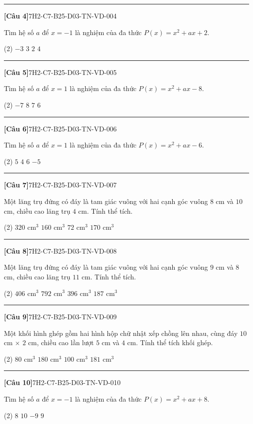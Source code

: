 \documentclass[12pt,a4paper]{article}
\newif\ifloigiai
\newenvironment{cauhoi}[2]{%
  \par\medskip\noindent\rule{\textwidth}{0.4pt}\par\nopagebreak
  \noindent\textbf{[#1]}\hfill{\scriptsize\ttfamily #2}\par\nopagebreak\smallskip}{\par}
\newcommand{\dapan}[1]{\ifloigiai\par\smallskip\noindent\textit{Đáp án:} \textbf{#1}\par\fi}
\begin{document}
\begin{cauhoi}{Câu 4}{7H2-C7-B25-D03-TN-VD-004}
Tìm hệ số $a$ để $x=-1$ là nghiệm của đa thức $P(x)=x^{2}+ax+2$.
\begin{tasks}(2)
\task $-3$
\task $3$
\task $2$
\task $4$
\end{tasks}
\dapan{B}
\end{cauhoi}
\begin{cauhoi}{Câu 5}{7H2-C7-B25-D03-TN-VD-005}
Tìm hệ số $a$ để $x=1$ là nghiệm của đa thức $P(x)=x^{2}+ax-8$.
\begin{tasks}(2)
\task $-7$
\task $8$
\task $7$
\task $6$
\end{tasks}
\dapan{C}
\end{cauhoi}
\begin{cauhoi}{Câu 6}{7H2-C7-B25-D03-TN-VD-006}
Tìm hệ số $a$ để $x=1$ là nghiệm của đa thức $P(x)=x^{2}+ax-6$.
\begin{tasks}(2)
\task $5$
\task $4$
\task $6$
\task $-5$
\end{tasks}
\dapan{A}
\end{cauhoi}
\begin{cauhoi}{Câu 7}{7H2-C7-B25-D03-TN-VD-007}
Một lăng trụ đứng có đáy là tam giác vuông với hai cạnh góc vuông $8$ cm và $10$ cm, chiều cao lăng trụ $4$ cm. Tính thể tích.
\begin{tasks}(2)
\task $320\text{ cm}^3$
\task $160\text{ cm}^3$
\task $72\text{ cm}^3$
\task $170\text{ cm}^3$
\end{tasks}
\dapan{B}
\end{cauhoi}
\begin{cauhoi}{Câu 8}{7H2-C7-B25-D03-TN-VD-008}
Một lăng trụ đứng có đáy là tam giác vuông với hai cạnh góc vuông $9$ cm và $8$ cm, chiều cao lăng trụ $11$ cm. Tính thể tích.
\begin{tasks}(2)
\task $406\text{ cm}^3$
\task $792\text{ cm}^3$
\task $396\text{ cm}^3$
\task $187\text{ cm}^3$
\end{tasks}
\dapan{C}
\end{cauhoi}
\begin{cauhoi}{Câu 9}{7H2-C7-B25-D03-TN-VD-009}
Một khối hình ghép gồm hai hình hộp chữ nhật xếp chồng lên nhau, cùng đáy $10$ cm $\times$ $2$ cm, chiều cao lần lượt $5$ cm và $4$ cm. Tính thể tích khối ghép.
\begin{tasks}(2)
\task $80\text{ cm}^3$
\task $180\text{ cm}^3$
\task $100\text{ cm}^3$
\task $181\text{ cm}^3$
\end{tasks}
\dapan{B}
\end{cauhoi}
\begin{cauhoi}{Câu 10}{7H2-C7-B25-D03-TN-VD-010}
Tìm hệ số $a$ để $x=-1$ là nghiệm của đa thức $P(x)=x^{2}+ax+8$.
\begin{tasks}(2)
\task $8$
\task $10$
\task $-9$
\task $9$
\end{tasks}
\dapan{D}
\end{cauhoi}
\end{document}
